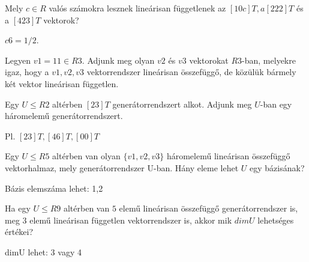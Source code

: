 \begin{frame}
  \begin{tcolorbox}[title={3/4. -R-}]
       Mely $c ∈ R$ valós számokra lesznek lineárisan függetlenek az $[1 0 c]T, a [2 2 2]T$ és a $[4 2 3]T$ vektorok?
  \tcblower

    \mmedskip 
  
    $c 6= 1/2$.
  \end{tcolorbox}
\end{frame}


\begin{frame}
  \begin{tcolorbox}[title={3/5. -R-}]
       Legyen $v1 = 1 1  ∈ R3$. Adjunk meg olyan $v2$ és $v3$ vektorokat $R3$-ban, melyekre igaz, hogy a $v1,v2,v3$ vektorrendszer lineárisan összefüggő, de közülük bármely két vektor lineárisan független.
  \tcblower

    \mmedskip 
  

  \end{tcolorbox}
\end{frame}


\begin{frame}
  \begin{tcolorbox}[title={3/6. -N-}]
        Egy $U ≤ R2$ altérben $[2 3]T$ generátorrendszert alkot. Adjunk meg $U$-ban egy háromelemű generátorrendszert.
  \tcblower

    \mmedskip 
  
     Pl. $[2 3]T, [4 6]T, [0 0]T$
  \end{tcolorbox}
\end{frame}


\begin{frame}
  \begin{tcolorbox}[title={3/7. -R-}]
    Egy $U ≤ R5$ altérben van olyan $\{v1,v2,v3\}$ háromelemű lineárisan összefüggő vektorhalmaz, mely generátorrendszer U-ban. Hány eleme lehet $U$ egy bázisának?
  \tcblower

    \mmedskip 
  
     Bázis elemszáma lehet: 1,2
  \end{tcolorbox}
\end{frame}


\begin{frame}
  \begin{tcolorbox}[title={3/8. -R-}]
    Ha egy $U ≤ R9$ altérben van $5$ elemű lineárisan összefüggő generátorrendszer is, meg $3$ elemű lineárisan független vektorrendszer is, akkor mik $dimU$ lehetséges értékei?

  \tcblower

    \mmedskip 
  
     dimU lehet: 3 vagy 4
  \end{tcolorbox}
\end{frame}


